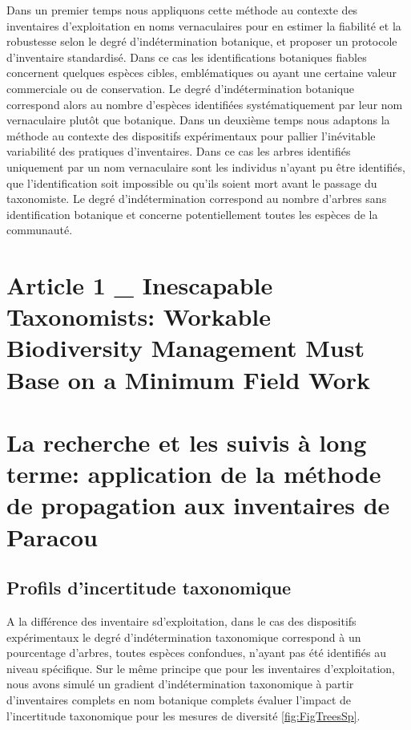 \documentclass[
  11pt,
  french,
  A4paper,
  extrafontsizes,onecolumn,openright
  ]{memoir}
\begin{document}
Dans un premier temps nous appliquons cette méthode au contexte des
inventaires d'exploitation en noms vernaculaires pour en estimer la
fiabilité et la robustesse selon le degré d'indétermination botanique,
et proposer un protocole d'inventaire standardisé. Dans ce cas les
identifications botaniques fiables concernent quelques espèces cibles,
emblématiques ou ayant une certaine valeur commerciale ou de
conservation. Le degré d'indétermination botanique correspond alors au
nombre d'espèces identifiées systématiquement par leur nom vernaculaire
plutôt que botanique. Dans un deuxième temps nous adaptons la méthode au
contexte des dispositifs expérimentaux pour pallier l'inévitable
variabilité des pratiques d'inventaires. Dans ce cas les arbres
identifiés uniquement par un nom vernaculaire sont les individus n'ayant
pu être identifiés, que l'identification soit impossible ou qu'ils
soient mort avant le passage du taxonomiste. Le degré d'indétermination
correspond au nombre d'arbres sans identification botanique et concerne
potentiellement toutes les espèces de la communauté.

\section{Article 1 \_ Inescapable Taxonomists: Workable Biodiversity
Management Must Base on a Minimum Field
Work}\label{article-1-_-inescapable-taxonomists-workable-biodiversity-management-must-base-on-a-minimum-field-work}

\section{La recherche et les suivis à long terme: application de la
méthode de propagation aux inventaires de
Paracou}\label{la-recherche-et-les-suivis-a-long-terme-application-de-la-methode-de-propagation-aux-inventaires-de-paracou}

\subsection{Profils d'incertitude
taxonomique}\label{profils-dincertitude-taxonomique}

A la différence des inventaire sd'exploitation, dans le cas des
dispositifs expérimentaux le degré d'indétermination taxonomique
correspond à un pourcentage d'arbres, toutes espèces confondues, n'ayant
pas été identifiés au niveau spécifique. Sur le même principe que pour
les inventaires d'exploitation, nous avons simulé un gradient
d'indétermination taxonomique à partir d'inventaires complets en nom
botanique complets évaluer l'impact de l'incertitude taxonomique pour
les mesures de diversité \ref{fig:FigTreesSp}.
\end{document}

